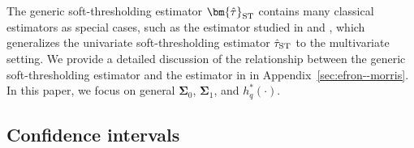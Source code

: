 \documentclass[11pt]{article}
\newcommand{\htau}{\widehat\tau}
\numberwithin{equation}{section}
\newtheorem{theorem}{Theorem}[section]
\theoremstyle{definition}
\begin{document}
The generic soft-thresholding estimator $\bm{\hat\tau}_{\rm ST}$ contains many classical estimators as special cases, such as the estimator studied in \citet[Theorem 3]{j1981estimation} and \citet[Section 4]{bickel1984parametric}, which generalizes the univariate soft-thresholding estimator $\hat\tau_{\rm ST}$ to the multivariate setting. We provide a detailed discussion of the relationship between the generic soft-thresholding estimator and the estimator in \citet{j1981estimation, bickel1984parametric} in Appendix~\ref{sec:efron--morris}. In this paper, we focus on general $\bm{\Sigma}_0$, $\bm{\Sigma}_1$, and $h_q^*(\cdot)$.







\subsection{Confidence intervals}
\end{document}
